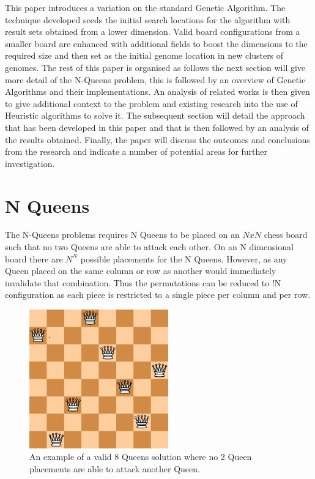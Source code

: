 \documentclass[a4paper,onecolumn,11pt]{article}
\begin{document}
This paper introduces a variation on the standard Genetic Algorithm. The technique developed seeds the initial search locations for the algorithm with result sets obtained from a lower dimension. Valid board configurations from a smaller board are enhanced with additional fields to boost the dimensions to the required size and then set as the initial genome location in new clusters of genomes. The rest of this paper is organised as follows the next section will give more detail of the N-Queens problem, this is followed by an overview of Genetic Algorithms and their implementations. An analysis of related works is then given to give additional context to the problem and existing research into the use of Heuristic algorithms to solve it. The subsequent section will detail the approach that has been developed in this paper and that is then followed by an analysis of the results obtained. Finally, the paper will discuss the outcomes and conclusions from the research and indicate a number of potential areas for further investigation.

\section{N Queens}
The N-Queens problems requires N Queens to be placed on an $NxN$ chess board such that no two Queens are able to attack each other. On an N dimensional board there are $N^{N}$ possible placements for the N Queens. However, as any Queen placed on the same column or row as another would immediately invalidate that combination. Thus the permutations can be reduced to !N configuration as each piece is restricted to a single piece per column and per row.

\begin{figure}[!htbp]
	\centering	
	\includegraphics[width=6cm, height=6cm]{Valid8QueensSolution}
	\caption{An example of a valid 8 Queens solution where no 2 Queen placements are able to attack another Queen.}
\end{figure}
\end{document}
